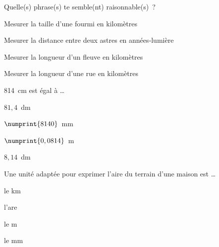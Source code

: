 \begin{QCM}
\begin{GroupeQCM}
    
    \begin{exercice}
      Quelle(s) phrase(s) te semble(nt) raisonnable(s) ?
      \begin{ChoixQCM}{4}
      \item Mesurer la taille d'une fourmi en kilomètres
      \item Mesurer la distance entre deux astres en années‑lumière
      \item Mesurer la longueur d'un fleuve en kilomètres
      \item Mesurer la longueur d'une rue en kilomètres
      \end{ChoixQCM}
\begin{corrige}
   \end{corrige}
    \end{exercice}


    \begin{exercice}
      814 cm est égal à \ldots
      \begin{ChoixQCM}{4}
      \item $81,4$ dm
      \item $\numprint{8140}$ mm
      \item $\numprint{0,0814}$ m
      \item $8,14$ dm
      \end{ChoixQCM}
\begin{corrige}
   \end{corrige}
    \end{exercice}
    
 
    \begin{exercice}
      Une unité adaptée pour exprimer l'aire du terrain d'une maison est \ldots
      \begin{ChoixQCM}{4}
      \item le km
      \item l'are
      \item le m
      \item le mm
      \end{ChoixQCM}
\begin{corrige}
   \end{corrige}
    \end{exercice}

\end{GroupeQCM}
\end{QCM}
   


